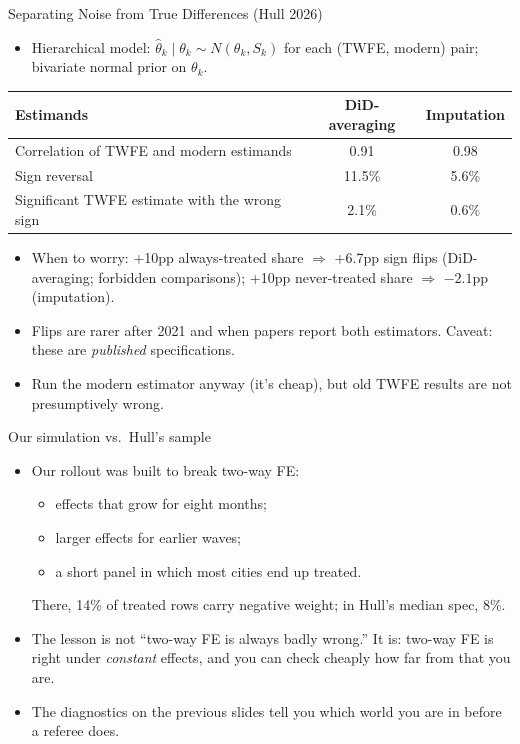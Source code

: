\documentclass[aspectratio=169,11pt]{beamer}
\begin{document}
\begin{frame}{Separating Noise from True Differences (Hull 2026)}
\footnotesize
\begin{itemize}
\item Hierarchical model: $\hat\theta_k \mid \theta_k \sim N(\theta_k, S_k)$ for each (TWFE, modern) pair; bivariate normal prior on $\theta_k$.
\end{itemize}
\smallskip
\begin{center}
\begin{tabular}{lcc}
\toprule
Estimands & DiD-averaging & Imputation \\
\midrule
Correlation of TWFE and modern estimands & 0.91 & 0.98 \\
Sign reversal & 11.5\% & 5.6\% \\
Significant TWFE estimate with the wrong sign & 2.1\% & 0.6\% \\
\bottomrule
\end{tabular}
\end{center}
\smallskip
\begin{itemize}
\item \alert{When to worry:} +10pp always-treated share $\Rightarrow$ +6.7pp sign flips (DiD-averaging; forbidden comparisons); +10pp never-treated share $\Rightarrow$ $-2.1$pp (imputation).
\item Flips are rarer after 2021 and when papers report both estimators. Caveat: these are \emph{published} specifications.
\item Run the modern estimator anyway (it's cheap), but old TWFE results are not presumptively wrong.
\end{itemize}
\end{frame}


\begin{frame}{Our simulation vs.\ Hull's sample}
\begin{itemize}
	\item Our rollout was built to break two-way FE:
	\begin{itemize}
		\item effects that grow for eight months;
		\item larger effects for earlier waves;
		\item a short panel in which most cities end up treated.
	\end{itemize}
	There, 14\% of treated rows carry negative weight; in Hull's median spec, 8\%.
	\medskip
	\item The lesson is not ``two-way FE is always badly wrong.'' It is: two-way FE is right under \emph{constant} effects,
	and you can check cheaply how far from that you are.
	\medskip
	\item The diagnostics on the previous slides tell you which world you are in before a referee does.
\end{itemize}
\end{frame}
\end{document}
